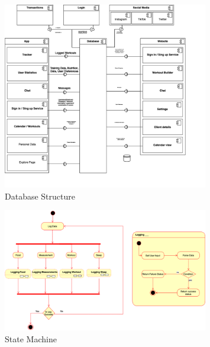 \begin{figure}[H]
    \centering
    \includegraphics[width=0.8\textwidth]{images/uml.png}
    \caption{Database Structure}
    \label{fig:uml}
  \end{figure}

\begin{figure}[H]
    \centering
    \includegraphics[width=0.8\textwidth]{images/state_machine.png}
    
    \caption{State Machine}
    \label{fig:state_machine}
  \end{figure}

